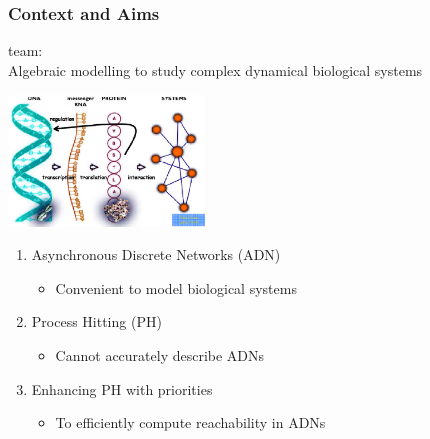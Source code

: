 
\begin{frame}[c]
  \frametitle{Context and Aims}


 team:\\
\quad \quad Algebraic modelling to study complex dynamical biological systems

\begin{center}
  \includegraphics[height=3.5cm]{figs/dnascheme_white.png}
\end{center}

\pause
\begin{enumerate}[1)]
  \item Asynchronous Discrete Networks (ADN)
  \begin{itemize}
    \item[] Convenient to model biological systems
  \end{itemize}

  \smallskip
  \item Process Hitting (PH)
  \begin{itemize}
    \item[] Cannot accurately describe ADNs
  \end{itemize}

  \smallskip
  \item Enhancing PH with priorities
  \begin{itemize}
    \item[] To efficiently compute reachability in ADNs
  \end{itemize}
\end{enumerate}

\end{frame}
